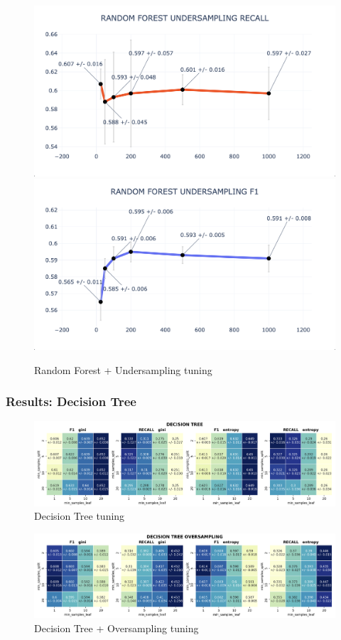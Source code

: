 \documentclass{article}
\begin{document}
	\begin{figure}[H]
		\centering
		\includegraphics[width=.49\textwidth]{clf_img/RF_US_recall.png}
		\includegraphics[width=.49\textwidth]{clf_img/RF_US_f1.png}
		\caption{Random Forest + Undersampling tuning}
		\label{fig:hyper_rf_us}
	\end{figure}
	
	
	\subsubsection{Results: Decision Tree}
	\begin{figure}[H]
		\centering
		\includegraphics[width=.9\textwidth]{clf_img/DecisionTree.png}
		\caption{Decision Tree tuning}
		\label{fig:hyper_dectree}
	\end{figure}
	
	\begin{figure}[H]
		\centering
		\includegraphics[width=.9\textwidth]{clf_img/DecisionTree_OS.png}
		\caption{Decision Tree + Oversampling tuning}
		\label{fig:hyper_dectreeOS}
	\end{figure}
	
\end{document}
